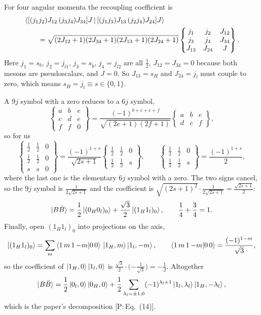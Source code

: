 \documentclass[11pt,a4paper]{article}
\newcommand{\tagP}[1]{\textcolor{blue!65!black}{\textsf{\small[P:\,#1]}}}
\newenvironment{aiadd}{\par}{\par}
\begin{document}
\begin{aiadd}
	For four angular momenta the recoupling coefficient is
	\begin{align*}
		 & \braket{[(j_1j_2)J_{12}\,(j_3j_4)J_{34}]J\,|\,[(j_1j_3)J_{13}\,(j_2j_4)J_{24}]J}                                                                        \\
		 & \qquad=\sqrt{(2J_{12}+1)(2J_{34}+1)(2J_{13}+1)(2J_{24}+1)}\begin{Bmatrix}j_1&j_2&J_{12}\\ j_3&j_4&J_{34}\\ J_{13}&J_{24}&J\end{Bmatrix}.
	\end{align*}
	Here $j_1=s_b$, $j_2=j_{l1}$, $j_3=s_{\bar b}$, $j_4=j_{l2}$ are all $\frac12$, $J_{12}=J_{34}=0$ because both mesons are pseudoscalars, and $J=0$. So $J_{13}=s_H$ and $J_{24}=j_l$ must couple to zero, which means $s_H=j_l\equiv s\in\{0,1\}$.

	A $9j$ symbol with a zero reduces to a $6j$ symbol,
	\[
		\begin{Bmatrix}a&b&e\\ c&d&e\\ f&f&0\end{Bmatrix}=\frac{(-1)^{b+c+e+f}}{\sqrt{(2e+1)(2f+1)}}\begin{Bmatrix}a&b&e\\ d&c&f\end{Bmatrix},
	\]
	so for us
	\[
		\begin{Bmatrix}\frac12&\frac12&0\\[0.5mm] \frac12&\frac12&0\\[0.5mm] s&s&0\end{Bmatrix}=\frac{(-1)^{1+s}}{\sqrt{2s+1}}\begin{Bmatrix}\frac12&\frac12&0\\[0.5mm] \frac12&\frac12&s\end{Bmatrix},
		\qquad
		\begin{Bmatrix}\frac12&\frac12&0\\[0.5mm] \frac12&\frac12&s\end{Bmatrix}=\frac{(-1)^{1+s}}{2},
	\]
	where the last one is the elementary $6j$ symbol with a zero. The two signs cancel, so the $9j$ symbol is $\frac{1}{2\sqrt{2s+1}}$ and the coefficient is $\sqrt{(2s+1)^2}\cdot\frac{1}{2\sqrt{2s+1}}=\frac{\sqrt{2s+1}}{2}$:
	\[
		\ket{B\bar B}=\frac12\ket{(0_H0_l)_0}+\frac{\sqrt3}{2}\ket{(1_H1_l)_0},\qquad\frac14+\frac34=1 .
	\]
	Finally, open $(1_H1_l)_0$ into projections on the axis,
	\[
		\ket{(1_H1_l)_0}=\sum_m\braket{1\,m\,1\,{-m}|0\,0}\,\ket{1_H,m}\ket{1_l,-m},\qquad\braket{1\,m\,1\,{-m}|0\,0}=\frac{(-1)^{1-m}}{\sqrt3},
	\]
	so the coefficient of $\ket{1_H,0}\ket{1_l,0}$ is $\frac{\sqrt3}{2}\cdot\big({-\frac{1}{\sqrt3}}\big)=-\frac12$. Altogether
	\[
		\ket{B\bar B}=\frac12\ket{0_l,0}\ket{0_H,0}+\frac12\sum_{\lambda_l=\pm1,0}(-1)^{\lambda_l+1}\ket{1_l,\lambda_l}\ket{1_H,-\lambda_l},
	\]
	which is the paper's decomposition \tagP{Eq.~(14)}.
\end{aiadd}
\end{document}
